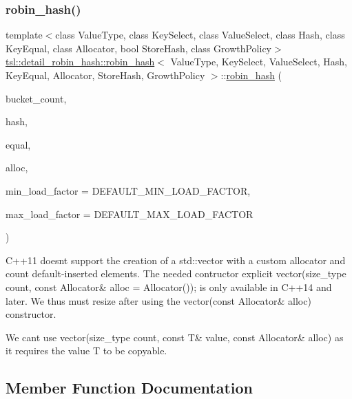 \subsubsection{\texorpdfstring{robin\_hash()}{robin\_hash()}}
{\footnotesize\ttfamily template$<$class Value\+Type, class Key\+Select, class Value\+Select, class Hash, class Key\+Equal, class Allocator, bool Store\+Hash, class Growth\+Policy$>$ \\
\mbox{\hyperlink{classtsl_1_1detail__robin__hash_1_1robin__hash}{tsl\+::detail\+\_\+robin\+\_\+hash\+::robin\+\_\+hash}}$<$ Value\+Type, Key\+Select, Value\+Select, Hash, Key\+Equal, Allocator, Store\+Hash, Growth\+Policy $>$\+::\mbox{\hyperlink{classtsl_1_1detail__robin__hash_1_1robin__hash}{robin\+\_\+hash}} (\begin{DoxyParamCaption}\item[{size\+\_\+type}]{bucket\+\_\+count,  }\item[{const Hash \&}]{hash,  }\item[{const Key\+Equal \&}]{equal,  }\item[{const Allocator \&}]{alloc,  }\item[{float}]{min\+\_\+load\+\_\+factor = {\ttfamily DEFAULT\+\_\+MIN\+\_\+LOAD\+\_\+FACTOR},  }\item[{float}]{max\+\_\+load\+\_\+factor = {\ttfamily DEFAULT\+\_\+MAX\+\_\+LOAD\+\_\+FACTOR} }\end{DoxyParamCaption})\hspace{0.3cm}{\ttfamily [inline]}}

C++11 doesn\textquotesingle{}t support the creation of a std\+::vector with a custom allocator and \textquotesingle{}count\textquotesingle{} default-\/inserted elements. The needed contructor {\ttfamily explicit vector(size\+\_\+type count, const Allocator\& alloc = Allocator());} is only available in C++14 and later. We thus must resize after using the {\ttfamily vector(const Allocator\& alloc)} constructor.

We can\textquotesingle{}t use {\ttfamily vector(size\+\_\+type count, const T\& value, const Allocator\& alloc)} as it requires the value T to be copyable. 

\subsection{Member Function Documentation}
\mbox{\label{classtsl_1_1detail__robin__hash_1_1robin__hash_a771eb1a20fab68e5d645576ec87a9225}} 
